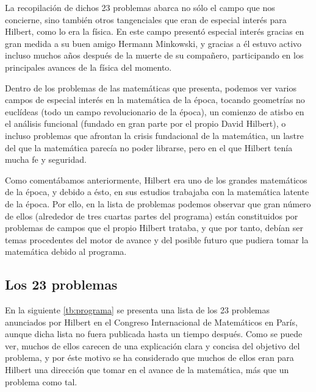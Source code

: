La recopilación de dichos 23 problemas abarca no sólo el campo que nos concierne, sino también otros tangenciales que eran de especial 
interés para Hilbert, como lo era la física. En este campo presentó especial interés gracias en gran medida a su buen amigo Hermann Minkowski,
y gracias a él estuvo activo incluso muchos años después de la muerte de su compañero, participando en los principales avances de la física del momento.

Dentro de los problemas de las matemáticas que presenta, podemos ver varios campos de especial interés en la matemática de la época, tocando geometrías no euclídeas
(todo un campo revolucionario de la época), un comienzo de atisbo en el análisis funcional (fundado en gran parte por el propio David Hilbert),
o incluso problemas que afrontan la crisis fundacional de la matemática, un lastre del que la matemática parecía no poder librarse, pero en el que Hilbert 
tenía mucha fe y seguridad.

Como comentábamos anteriormente, Hilbert era uno de los grandes matemáticos de la época, y debido a ésto, en sus estudios trabajaba con la 
matemática latente de la época. Por ello, en la lista de problemas podemos observar que gran número de ellos (alrededor de tres cuartas partes del
programa) están constituidos por problemas de campos que el propio Hilbert trataba, y que por tanto, debían ser temas procedentes del motor de avance
y del posible futuro que pudiera tomar la matemática debido al programa. 

  
\subsection{Los 23 problemas}

En la siguiente \autoref{tb:programa} se presenta una lista de los 23 problemas anunciados por Hilbert en el Congreso Internacional de Matemáticos en París,
aunque dicha lista no fuera publicada hasta un tiempo después. Como se puede ver, muchos de ellos carecen de una explicación clara y concisa del objetivo del problema,
y por éste motivo se ha considerado que muchos de ellos eran para Hilbert una dirección que tomar en el avance de la matemática, más que un problema como tal.

